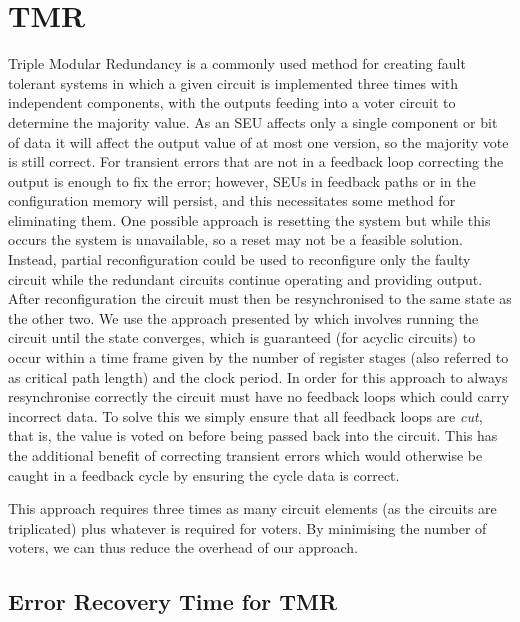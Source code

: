 \documentclass[12pt,final,oneside,a4paper]{dwThesis} %
\begin{document}
   \section{\gls{TMR}
   }\label{secTMR} Triple Modular Redundancy is a
   commonly used method for creating fault tolerant systems in which a given
   circuit is implemented three times with independent components, with the
   outputs feeding into a voter circuit to determine the majority value. As an
   \gls{SEU} affects only a single component or bit of data it
   will affect the output value of at most one version, so the majority vote is
   still correct. For transient errors that are not in a feedback loop correcting
   the output is enough to fix the error; however, \glspl{SEU} in feedback paths
   or in the configuration memory will persist, and this necessitates some method
   for eliminating them. One possible approach is resetting the system but while
   this occurs the system is unavailable, so a reset may not be a feasible
   solution. Instead, partial reconfiguration could be used to reconfigure only
   the faulty circuit while the redundant circuits continue operating and
   providing output. After reconfiguration the circuit must then be resynchronised
   to the same state as the other two. We use the approach presented by
   \cite{DiesselChange} which involves running the circuit until the state
   converges, which is guaranteed (for acyclic circuits) to occur within a
   time frame given by the number of register stages (also referred to as critical path length)
    and the clock period. In
   order for this approach to always resynchronise correctly the circuit must have
   no feedback loops which could carry incorrect data. To solve this we simply
   ensure that all feedback loops are \textit{cut}, that is, the value is voted on
   before being passed back into the circuit. This has the additional benefit of
   correcting transient errors which would otherwise be caught in a feedback cycle
   by ensuring the cycle data is correct.

   This approach requires three times as many circuit elements (as the circuits
   are triplicated) plus whatever is required for voters. By minimising the
   number of voters, we can thus reduce the overhead of our approach.

   \subsection{Error Recovery Time for \gls{TMR}}
\end{document}
